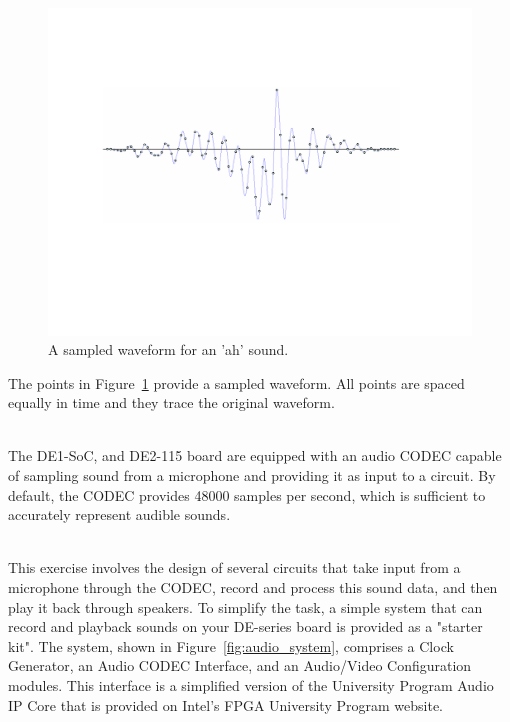 \documentclass[epsfig,10pt,fullpage]{article}
\begin{document}
\begin{figure}[H]
\centering
\includegraphics[width=4.5in]{figures/sampled_waveform.pdf}
\caption{A sampled waveform for an 'ah' sound.}
\label{fig:sampled_waveform}
\end{figure}

The points in Figure~\ref{fig:sampled_waveform} provide a sampled waveform. All points are spaced 
equally in time and they trace the original waveform.

~\\
The  DE1-SoC, and DE2-115 board are equipped with an audio CODEC capable of sampling sound from a microphone and providing it
as input to a circuit. By default, the CODEC provides 48000 samples per second, which is sufficient to accurately represent
audible sounds.

~\\
This exercise involves the design of several circuits that take input from a microphone
through the CODEC, record and process this sound data, and then play it back through 
speakers. To simplify the task, a simple system that can record and playback sounds on
your DE-series board is provided as a "starter kit". The system, shown in 
Figure~\ref{fig:audio_system}, comprises a {\sf Clock Generator}, an
{\sf Audio CODEC Interface}, and an {\sf Audio/Video Configuration} modules. This interface is 
a simplified version of the 
University Program Audio IP Core that is provided on Intel's FPGA University Program website.
\end{document}
